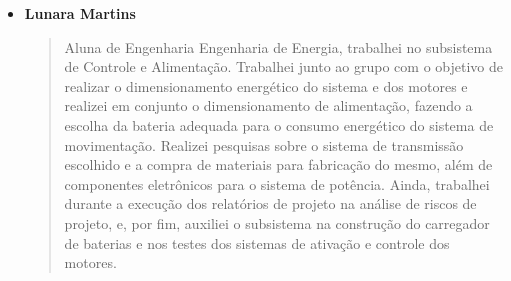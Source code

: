 \begin{itemize}
    \item \textbf{Lunara Martins}
    \begin{quote}
      Aluna de Engenharia Engenharia de Energia, trabalhei no subsistema de 
      Controle e Alimentação. Trabalhei junto ao grupo com o objetivo de 
      realizar o dimensionamento energético do sistema e dos motores e 
      realizei em conjunto o dimensionamento de alimentação, fazendo a escolha 
      da bateria adequada para o consumo energético do sistema de movimentação. 
      Realizei pesquisas sobre o sistema de transmissão escolhido e a compra de 
      materiais para fabricação do mesmo, além de componentes eletrônicos para o 
      sistema de potência. Ainda, trabalhei durante a execução dos relatórios de 
      projeto na análise de riscos de projeto, e, por fim, auxiliei o subsistema 
      na construção do carregador de baterias e nos testes dos sistemas de 
      ativação e controle dos motores. 
    \end{quote}
\end{itemize}
